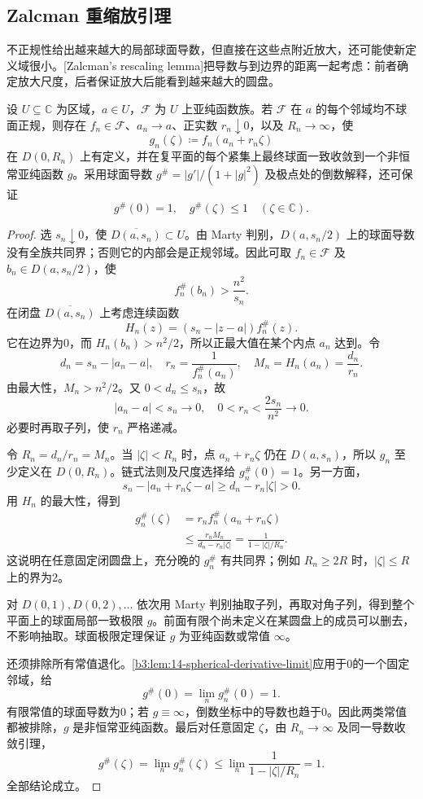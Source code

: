 \subsection{Zalcman 重缩放引理}
\label{b3:subsec:140303}

不正规性给出越来越大的局部球面导数，但直接在这些点附近放大，还可能使新定义域很小。[Zalcman's rescaling lemma]把导数与到边界的距离一起考虑：前者确定放大尺度，后者保证放大后能看到越来越大的圆盘。

\begin{lemma}\label{b3:lem:14-zalcman-rescaling}
设 \(U\subseteq\mathbb C\) 为区域，\(a\in U\)，\(\mathcal F\) 为 \(U\) 上亚纯函数族。若 \(\mathcal F\) 在 \(a\) 的每个邻域均不球面正规，则存在 \(f_n\in\mathcal F\)、\(a_n\to a\)、正实数 \(r_n\downarrow0\)，以及 \(R_n\to\infty\)，使
\[
 g_n(\zeta)\coloneqq f_n(a_n+r_n\zeta)
\]
在 \(D(0,R_n)\) 上有定义，并在复平面的每个紧集上最终球面一致收敛到一个非恒常亚纯函数 \(g\)。采用球面导数 \(g^\#=|g'|/(1+|g|^2)\) 及极点处的倒数解释，还可保证
\[
 g^\#(0)=1,\quad g^\#(\zeta)\le1
 \quad(\zeta\in\mathbb C).
\]
\end{lemma}
\begin{proof}
选 \(s_n\downarrow0\)，使 \(\overline{D(a,s_n)}\subset U\)。由 Marty 判别，\(D(a,s_n/2)\) 上的球面导数没有全族共同界；否则它的内部会是正规邻域。因此可取 \(f_n\in\mathcal F\) 及 \(b_n\in D(a,s_n/2)\)，使
\[
 f_n^\#(b_n)>\frac{n^2}{s_n}.
\]
在闭盘 \(\overline{D(a,s_n)}\) 上考虑连续函数
\[
 H_n(z)=(s_n-|z-a|)f_n^\#(z).
\]
它在边界为0，而 \(H_n(b_n)>n^2/2\)，所以正最大值在某个内点 \(a_n\) 达到。令
\[
 d_n=s_n-|a_n-a|,\quad
 r_n=\frac1{f_n^\#(a_n)},\quad
 M_n=H_n(a_n)=\frac{d_n}{r_n}.
\]
由最大性，\(M_n>n^2/2\)。又 \(0<d_n\le s_n\)，故
\[
 |a_n-a|<s_n\longrightarrow0,\quad
 0<r_n<\frac{2s_n}{n^2}\longrightarrow0.
\]
必要时再取子列，使 \(r_n\) 严格递减。

令 \(R_n=d_n/r_n=M_n\)。当 \(|\zeta|<R_n\) 时，点 \(a_n+r_n\zeta\) 仍在 \(D(a,s_n)\)，所以 \(g_n\) 至少定义在 \(D(0,R_n)\)。链式法则及尺度选择给 \(g_n^\#(0)=1\)。另一方面，
\[
 s_n-|a_n+r_n\zeta-a|
 \ge d_n-r_n|\zeta|>0.
\]
用 \(H_n\) 的最大性，得到
\[
 \begin{aligned}
 g_n^\#(\zeta)
 &=r_nf_n^\#(a_n+r_n\zeta)\\
 &\le\frac{r_nM_n}{d_n-r_n|\zeta|}
 =\frac1{1-|\zeta|/R_n}.
 \end{aligned}
\]
这说明在任意固定闭圆盘上，充分晚的 \(g_n^\#\) 有共同界；例如 \(R_n\ge2R\) 时，\(|\zeta|\le R\) 上的界为2。

对 \(D(0,1),D(0,2),\ldots\) 依次用 Marty 判别抽取子列，再取对角子列，得到整个平面上的球面局部一致极限 \(g\)。前面有限个尚未定义在某圆盘上的成员可以删去，不影响抽取。球面极限定理保证 \(g\) 为亚纯函数或常值 \(\infty\)。

还须排除所有常值退化。\cref{b3:lem:14-spherical-derivative-limit}应用于0的一个固定邻域，给
\[
 g^\#(0)=\lim_n g_n^\#(0)=1.
\]
有限常值的球面导数为0；若 \(g\equiv\infty\)，倒数坐标中的导数也趋于0。因此两类常值都被排除，\(g\) 是非恒常亚纯函数。最后对任意固定 \(\zeta\)，由 \(R_n\to\infty\) 及同一导数收敛引理，
\[
 g^\#(\zeta)
 =\lim_n g_n^\#(\zeta)
 \le\lim_n\frac1{1-|\zeta|/R_n}=1.
\]
全部结论成立。
\end{proof}

